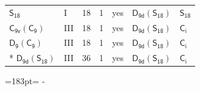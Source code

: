 \documentclass[10pt,a4paper]{article}
\newcommand{\needspace}[1]{\par\penalty-100\begingroup\dimen0=#1\relax\dimen2=\pagegoal
  \advance\dimen2-\pagetotal\ifdim\dimen0>\dimen2\relax\ifdim\dimen2>0pt\vfil\break\fi\fi
  \endgroup}
\numberwithin{equation}{section}
\newcommand{\grp}[1]{\mathsf{#1}}
\begin{document}
{\begin{longtable}{@{}llrrlll@{}}
\href{../../../rotation/data/pdf/S18.pdf}{$\grp{S_{18}}$} & I & 18 & 1 & yes & \href{D9d-S18.pdf}{$\grp{D_{9d}}(\grp{S_{18}})$} & \href{../../../rotation/data/pdf/S18.pdf}{$\grp{S_{18}}$}\\
\href{C9v-C9.pdf}{$\grp{C_{9v}}(\grp{C_{9}})$} & III & 18 & 1 & yes & \href{D9d-S18.pdf}{$\grp{D_{9d}}(\grp{S_{18}})$} & \href{../../../rotation/data/pdf/S2.pdf}{$\grp{C_{i}}$}\\
\href{D9-C9.pdf}{$\grp{D_{9}}(\grp{C_{9}})$} & III & 18 & 1 & yes & \href{D9d-S18.pdf}{$\grp{D_{9d}}(\grp{S_{18}})$} & \href{../../../rotation/data/pdf/S2.pdf}{$\grp{C_{i}}$}\\*
\href{D9d-S18.pdf}{$\grp{D_{9d}}(\grp{S_{18}})$} & III & 36 & 1 & yes & \href{D9d-S18.pdf}{$\grp{D_{9d}}(\grp{S_{18}})$} & \href{../../../rotation/data/pdf/S2.pdf}{$\grp{C_{i}}$}\\
\bottomrule\end{longtable}}
\needspace{183pt}
\end{document}
